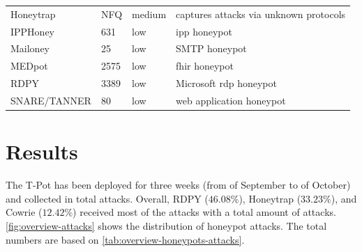 \begin{table}
\begin{tabularx}{\linewidth}{l|XlX}
        Honeytrap \cite{honeytrap2021}            & NFQ                                                                                                         & medium                     & captures attacks via unknown protocols                                               \\
        IPPHoney \cite{ipphoney2021}              & 631                                                                                                         & low                        & \ac{ipp} honeypot                                                                    \\
        Mailoney \cite{mailoney2021}              & 25                                                                                                          & low                        & SMTP honeypot                                                                        \\
        MEDpot \cite{medpot2021}                  & 2575                                                                                                        & low                        & \ac{fhir} honeypot                                                                   \\
        RDPY \cite{rdpy2021}                      & 3389                                                                                                        & low                        & Microsoft \ac{rdp} honeypot                                                          \\
        SNARE/TANNER \cite{snare2021}             & 80                                                                                                          & low                        & web application honeypot                                                             \\
        \bottomrule
    \end{tabularx}
    \label{tab:overview-honeypots}
\end{table}

\section{Results}
\label{sec:honeypots-heicloud}

The T-Pot has been deployed for three weeks (from  of September to  of October) and collected in total  attacks.
Overall, RDPY ($46.08\%$), Honeytrap ($33.23\%$), and Cowrie ($12.42\%$) received most of the attacks with a total amount of  attacks.
\autoref{fig:overview-attacks} shows the distribution of honeypot attacks.
The total numbers are based on \autoref{tab:overview-honeypots-attacks}.

